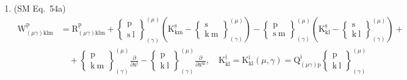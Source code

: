 \documentclass[12pt]{article}
\begin{document}
\begin{enumerate}[label=(\arabic*), series=formellist]
    \item (SM Eq.\ 54a) 
    \[
    \begin{aligned}
    \mathrm{W}^{\underline{\mathrm{p}}}_{(\mu\gamma)\mathrm{klm}} &= \mathrm{R}^{\underline{\mathrm{p}}}_{(\mu\gamma)\mathrm{klm}} + \left\{ \begin{smallmatrix} \mathrm{p} \\ \mathrm{s\ l} \end{smallmatrix} \right\}^{(\mu)}_{(\gamma)} \left( \mathrm{K}^{\underline{\mathrm{s}}}_{\mathrm{km}} - \left\{ \begin{smallmatrix} \mathrm{s} \\ \mathrm{k\ m} \end{smallmatrix} \right\}^{(\mu)}_{(\gamma)} \right) - \left\{ \begin{smallmatrix} \mathrm{p} \\ \mathrm{s\ m} \end{smallmatrix} \right\}^{(\mu)}_{(\gamma)} \left( \mathrm{K}^{\underline{\mathrm{s}}}_{\mathrm{kl}} - \left\{ \begin{smallmatrix} \mathrm{s} \\ \mathrm{k\ l} \end{smallmatrix} \right\}^{(\mu)}_{(\gamma)} \right) + \\
    &\quad + \left\{ \begin{smallmatrix} \mathrm{p} \\ \mathrm{k\ m} \end{smallmatrix} \right\}^{(\mu)}_{(\gamma)} \frac{\partial}{\partial \mathrm{x}^{\underline{\mathrm{l}}}} - \left\{ \begin{smallmatrix} \mathrm{p} \\ \mathrm{k\ l} \end{smallmatrix} \right\}^{(\mu)}_{(\gamma)} \frac{\partial}{\partial \mathrm{x}^{\underline{\mathrm{m}}}}, \quad \mathrm{K}^{\underline{\mathrm{i}}}_{\mathrm{kl}} = \mathrm{K}^\mathrm{i}_{\mathrm{kl}}(\mu, \gamma) = \mathrm{Q}^{\underline{\mathrm{i}}}_{(\mu\gamma)\mathrm{p}} \left\{ \begin{smallmatrix} \mathrm{p} \\ \mathrm{k\ l} \end{smallmatrix} \right\}^{(\mu)}_{(\gamma)}
    \end{aligned}
    \]


\end{enumerate}
\end{document}
